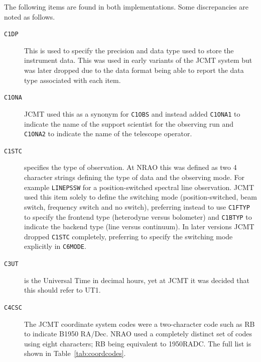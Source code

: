 \documentclass[final,authoryear,5p,times,twocolumn]{elsarticle}
\begin{document}
The following items are found in both implementations.
Some discrepancies are noted as follows.

\begin{description}

\item[\texttt{C1DP}] This is used to specify the precision and data
  type used to store the instrument data. This was used in early
  variants of the JCMT system but was later dropped due to the data
  format being able to report the data type associated with each item.

\item[\texttt{C1ONA}] JCMT used this as a synonym for \texttt{C1OBS}
  and instead added \texttt{C1ONA1} to indicate the name of the
  support scientist for the observing run and \texttt{C1ONA2} to
  indicate the name of the telescope operator.

\item[\texttt{C1STC}] specifies the type of observation. At NRAO this
  was defined as two 4 character strings defining the type of data and
  the observing mode. For example \texttt{LINEPSSW} for a
  position-switched spectral line observation. JCMT used this item
  solely to define the switching mode (position-switched, beam switch,
  frequency switch and no switch), preferring instead to use
  \texttt{C1FTYP} to specify the frontend type (heterodyne versus
  bolometer) and \texttt{C1BTYP} to indicate the backend type (line
  versus continuum). In
  later versions JCMT dropped \texttt{C1STC} completely, preferring to
  specify the switching mode explicitly in \texttt{C6MODE}.

\item[\texttt{C3UT}] is the Universal Time in decimal hours, yet at
  JCMT it was decided that this should refer to UT1.

\item[\texttt{C4CSC}] The JCMT coordinate system codes \citep{mtdn12}
  were a two-character code such as RB to indicate B1950 RA/Dec.
  NRAO used a completely distinct set of codes using eight
  characters; RB being equivalent to 1950RADC. The full list is shown
  in Table~\ref{tab:coordcodes}.


\end{description}
\end{document}
